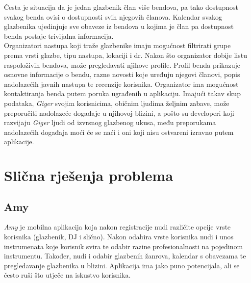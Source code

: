 		Česta je situacija da je jedan glazbenik član više bendova, pa tako dostupnost svakog benda ovisi o dostupnosti svih njegovih članova.  Kalendar svakog glazbenika ujedinjuje sve obaveze iz bendova u kojima je član pa dostupnost benda postaje trivijalna informacija. 
		\\
		
		Organizatori nastupa koji traže glazbenike imaju mogućnost filtrirati grupe prema vrsti glazbe, tipu nastupa, lokaciji i dr. Nakon što organizator dobije listu raspoloživih bendova, može pregledavati njihove profile. Profil benda prikazuje osnovne informacije o bendu, razne novosti koje uređuju njegovi članovi, popis nadolazećih javnih nastupa te recenzije korisnika. Organizator ima mogućnost kontaktiranja benda putem poruka ugrađenih u aplikaciju. Imajući takav skup podataka, \textit{Giger} svojim korisnicima, običnim ljudima željnim zabave, može preporučiti nadolazeće događaje u njihovoj blizini, a pošto su developeri koji razvijaju \textit{Giger} ljudi od izvrsnog glazbenog ukusa, među preporukama nadolazećih događaja moći će se naći i oni koji nisu ostvareni izravno putem aplikacije.
		
		\section{Slična rješenja problema}
		
		\subsection{Amy}
		
		\textit{Amy} je mobilna aplikacija koja nakon registracije nudi različite opcije vrste korisnika (glazbenik, DJ i slično). Nakon odabira vrste korisnika nudi i unos instrumenata koje korisnik svira te odabir razine profesionalnosti na pojedinom instrumentu. Također, nudi i odabir glazbenih žanrova, kalendar s obavezama te pregledavanje glazbenika u blizini. Aplikacija ima jako puno potencijala, ali se često ruši što utječe na iskustvo korisnika. 
		
